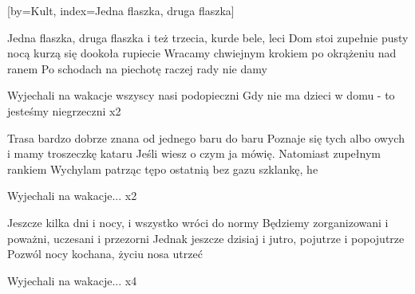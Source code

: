 [by={Kult},
                     index={Jedna flaszka, druga flaszka}]
\beginverse

\endverse
\beginverse

Jedna flaszka, druga flaszka i też trzecia, kurde bele, leci
Dom stoi zupełnie pusty nocą kurzą się dookoła rupiecie
Wracamy chwiejnym krokiem po okrążeniu nad ranem
Po schodach na piechotę raczej rady nie damy

\endverse
\beginverse

Wyjechali na wakacje wszyscy nasi podopieczni
Gdy nie ma dzieci w domu - to jesteśmy niegrzeczni x2

\endverse
\beginverse

Trasa bardzo dobrze znana od jednego baru do baru
Poznaje się tych albo owych i mamy troszeczkę kataru
Jeśli wiesz o czym ja mówię. Natomiast zupełnym rankiem
Wychylam patrząc tępo ostatnią bez gazu szklankę, he

\endverse
\beginverse

Wyjechali na wakacje... x2

\endverse
\beginverse

Jeszcze kilka dni i nocy, i wszystko wróci do normy
Będziemy zorganizowani i poważni, uczesani i przezorni
Jednak jeszcze dzisiaj i jutro, pojutrze i popojutrze
Pozwól nocy kochana, życiu nosa utrzeć

\endverse
\beginverse

Wyjechali na wakacje... x4


\endverse
\endsong